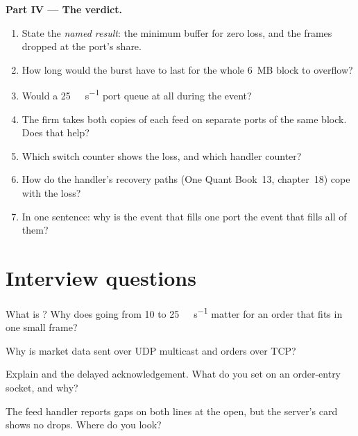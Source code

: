 \begin{problem}
\medskip\noindent\textbf{Part IV --- The verdict.}
\begin{enumerate}[resume]
\item State the \emph{named result}: the minimum buffer for zero loss, and the frames dropped at the port's share.
\item How long would the burst have to last for the whole 6~MB block to overflow?
\item Would a \qty{25}{\giga\bit\per\second} port queue at all during the event?
\item The firm takes both copies of each feed on separate ports of the same block. Does that help?
\item Which switch counter shows the loss, and which handler counter?
\item How do the handler's recovery paths (One Quant Book~13, chapter~18) cope with the loss?
\item In one sentence: why is the event that fills one port the event that fills all of them?
\end{enumerate}
\end{problem}

\section{Interview questions}

\begin{interviewq}\label{iq:nw:networking-for-trading:1}
What is ? Why does going from 10 to \qty{25}{\giga\bit\per\second} matter for an order that fits in one small
frame?
\end{interviewq}

\begin{interviewq}\label{iq:nw:networking-for-trading:2}
Why is market data sent over UDP multicast and orders over TCP?
\end{interviewq}

\begin{interviewq}\label{iq:nw:networking-for-trading:3}
Explain  and the delayed acknowledgement. What do you set on an order-entry socket, and why?
\end{interviewq}

\begin{interviewq}\label{iq:nw:networking-for-trading:4}
The feed handler reports gaps on both lines at the open, but the server's card shows no drops. Where do you look?
\end{interviewq}

